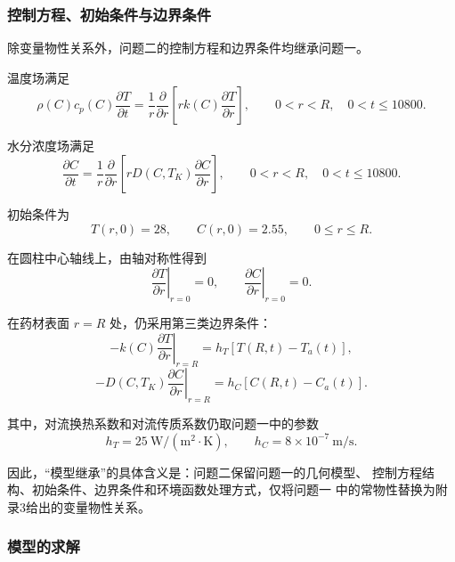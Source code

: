 \documentclass[12pt,a4paper]{article}
\renewcommand{\boxed}[1]{#1}
\begin{document}
\begin{center}
\subsubsection{控制方程、初始条件与边界条件}

除变量物性关系外，问题二的控制方程和边界条件均继承问题一。

温度场满足
\begin{equation}
\boxed{
\rho(C)c_p(C)\frac{\partial T}{\partial t}
=
\frac{1}{r}
\frac{\partial}{\partial r}
\left[
r k(C)\frac{\partial T}{\partial r}
\right]
},
\qquad
0<r<R,\quad 0<t\leq10800.
\end{equation}

水分浓度场满足
\begin{equation}
\boxed{
\frac{\partial C}{\partial t}
=
\frac{1}{r}
\frac{\partial}{\partial r}
\left[
rD(C,T_K)\frac{\partial C}{\partial r}
\right]
},
\qquad
0<r<R,\quad 0<t\leq10800.
\end{equation}

初始条件为
\begin{equation}
\boxed{
T(r,0)=28,\qquad C(r,0)=2.55
},
\qquad
0\leq r\leq R.
\end{equation}

在圆柱中心轴线上，由轴对称性得到
\begin{equation}
\boxed{
\left.\frac{\partial T}{\partial r}\right|_{r=0}=0,\qquad
\left.\frac{\partial C}{\partial r}\right|_{r=0}=0
}.
\end{equation}

在药材表面 $r=R$ 处，仍采用第三类边界条件：
\begin{equation}
\boxed{
-k(C)\left.\frac{\partial T}{\partial r}\right|_{r=R}
=
h_T\left[T(R,t)-T_a(t)\right]
},
\end{equation}
\begin{equation}
\boxed{
-D(C,T_K)\left.\frac{\partial C}{\partial r}\right|_{r=R}
=
h_C\left[C(R,t)-C_a(t)\right]
}.
\end{equation}

其中，对流换热系数和对流传质系数仍取问题一中的参数
\begin{equation}
h_T=25\ \mathrm{W/(m^2\cdot K)},\qquad
h_C=8\times10^{-7}\ \mathrm{m/s}.
\end{equation}

因此，“模型继承”的具体含义是：问题二保留问题一的几何模型、
控制方程结构、初始条件、边界条件和环境函数处理方式，仅将问题一
中的常物性替换为附录3给出的变量物性关系。

\subsubsection{模型的求解}


\end{center}
\end{document}
